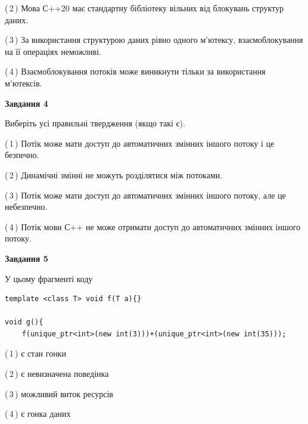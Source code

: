 \documentclass[12pt, ukrainian]{article}
\begin{document}
\begin {large}
{(\,2\,) Мова С++20 має стандартну бібліотеку вільних від блокувань структур даних.%

(\,3\,) За використання структурою даних рівно одного м’ютексу, взаємоблокування на її операціях неможливі.%

(\,4\,) Взаємоблокування потоків може виникнути тільки за використання м’ютексів.%



\begin{center}
\textbf{Завдання 4}
\end{center}
Виберіть усі правильні твердження (якщо такі є).\par
\vspace{2mm}

(\,1\,) Потік може мати доступ до автоматичних змінних іншого потоку і це безпечно.%

(\,2\,) Динамічні змінні не можуть розділятися між потоками.%

(\,3\,) Потік може мати доступ до автоматичних змінних іншого потоку, але це небезпечно.%

(\,4\,) Потік мови С++ не може отримати доступ до автоматичних змінних іншого потоку.%



\begin{center}
\textbf{Завдання 5}
\end{center}
У цьому фрагменті коду
\begin{verbatim}
template <class T> void f(T a){}

void g(){
    f(unique_ptr<int>(new int(3)))+(unique_ptr<int>(new int(35)));
\end{verbatim}

(\,1\,) є стан гонки%

(\,2\,) є невизначена поведінка%

(\,3\,) можливий виток ресурсів%

(\,4\,) є гонка даних%


}
\end {large}
\end{document}
